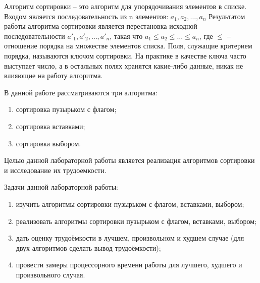 \Introduction    
    Алгоритм сортировки -- это алгоритм для упорядочивания элементов в списке.
    Входом является последовательность из n элементов: $ a_1, a_2, \dots, a_n $
    Результатом работы алгоритма сортировки является перестановка
    исходной последовательности $ a'_1, a'_2, \dots, a'_n $,
    такая что $ a_1 \leqslant a_2 \leqslant \dots \leqslant a_n $, 
    где $ \leqslant $ -- отношение порядка на множестве элементов списка.
    Поля, служащие критерием порядка, называются ключом сортировки.
    На практике в качестве ключа часто выступает число,
    а в остальных полях хранятся какие-либо данные, 
    никак не влияющие на работу алгоритма.
    
    В данной работе рассматриваются три алгоритма:
    \begin{enumerate}
        \item сортировка пузырьком с флагом;
        \item сортировка вставками;
        \item сортировка выбором.
    \end{enumerate}

    Целью данной лабораторной работы является реализация алгоритмов сортировки и
    исследование их трудоемкости.

    Задачи данной лабораторной работы:
    \begin{enumerate}
        \item изучить алгоритмы сортировки пузырьком с флагом, вставками, выбором;
        \item реализовать алгоритмы сортировки пузырьком с флагом, вставками, выбором;
        \item дать оценку трудоёмкости в лучшем, произвольном и худшем случае (для двух алгоритмов сделать вывод трудоёмкости);
        \item провести замеры процессорного времени работы для лучшего, худшего и произвольного случая.
    \end{enumerate}

\newpage